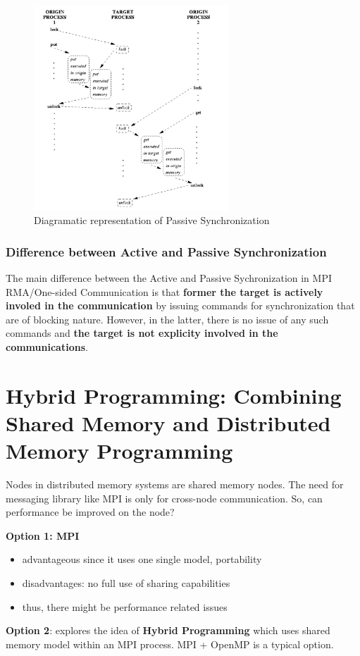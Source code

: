 \documentclass[12pt, a4paper]{report}
\begin{document}
\begin{figure}[h]
    \centering
    \includegraphics[width=0.65\textwidth]{Passive_synchronization}
    \caption{Diagramatic representation of Passive Synchronization}
    \label{fig:Passive_synchronization}
\end{figure}

\subsubsection{Difference between Active and Passive Synchronization}
The main difference between the Active and Passive Sychronization in MPI RMA/One-sided Communication is that {\bfseries{former the target is actively involed
in the communication}} by issuing commands for synchronization that are of blocking nature. However, in the latter, there is no issue of any such commands and
{\bfseries{the target is not explicity involved in the communications}}.

\section{Hybrid Programming: Combining Shared Memory and Distributed Memory Programming}
Nodes in distributed memory systems are shared memory nodes. The need for messaging library like MPI is only for cross-node communication. So, can performance 
be improved on the node?

{\bfseries{Option 1: MPI}}
\begin{itemize}
    \item advantageous since it uses one single model, portability
    \item disadvantages: no full use of sharing capabilities
    \item thus, there might be performance related issues
\end{itemize}
{\bfseries{Option 2}}: explores the idea of {\bfseries{Hybrid Programming}} which uses shared memory model within an MPI process. MPI + OpenMP is a typical option.
\end{document}
